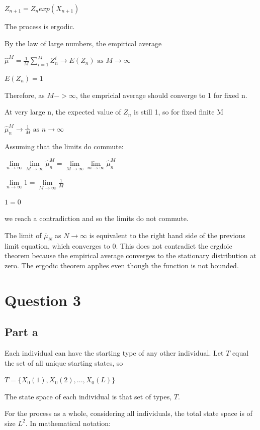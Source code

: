 \documentclass{article}
\begin{document}
$Z_{n+1} = Z_nexp(X_{n+1})$

The process is ergodic.

\bigskip

By the law of large numbers, the empirical average

$\hat{\mu}^M = \frac{1}{M} \sum_{i=1}^{M}Z_n^i \to E(Z_n) \text{ as } M \to \infty$

$E(Z_n) = 1$

Therefore, as $M -> \infty$, the empricial average should converge to 1 for fixed n.

At very large n, the expected value of $Z_n$ is still 1, so for fixed finite M  

$\hat{\mu}_n^M \to \frac{1}{M} \text{ as } n \to \infty$

\bigskip

Assuming that the limits do commute:

$\lim\limits_{n\to\infty} \lim\limits_{M\to\infty} \hat{\mu}_n^M = \lim\limits_{M\to\infty} \lim\limits_{m\to\infty} \hat{\mu}_n^M$

$\lim\limits_{n\to\infty} 1 = \lim\limits_{M\to\infty} \frac{1}{M}$

$1 = 0$
 
we reach a contradiction and so the limits do not commute.  
 
\bigskip

The limit of $\bar{\mu}_N$ as $N\to\infty$ is equivalent to the right hand side of the previous limit equation, which converges to 0. This does not contradict the ergdoic theorem because the empirical average converges to the stationary distribution at zero. The ergodic theorem applies even though the function is not bounded.  


\section{Question 3}

\subsection{Part a}

Each individual can have the starting type of any other individual. Let $T$ equal the set of all unique starting states, so 

$T = \{X_0(1), X_0(2), . . . , X_0(L)\}$

The state space of each individual is that set of types, $T$.

For the process as a whole, considering all individuals, the total state space is of size $L^2$. In mathematical notation:
\end{document}
